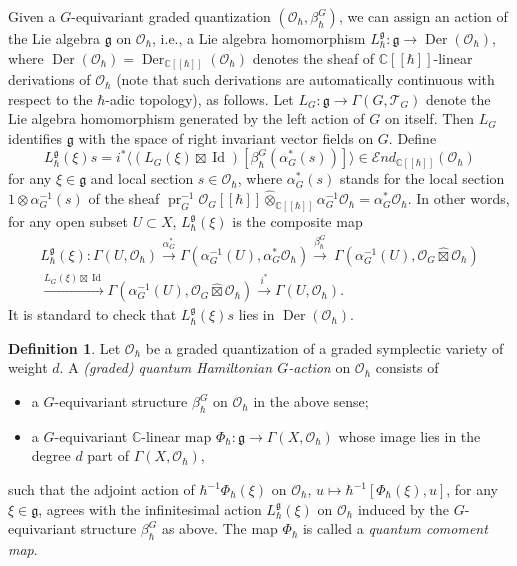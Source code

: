 \documentclass[12pt]{amsart}
\newcommand{\C}{\mathbb{C}}
\newcommand{\g}{\mathfrak{g}}
\newcommand{\send}{\mathcal{E}nd}
\newcommand{\Id}{\operatorname{Id}}
\newcommand{\pr}{\operatorname{pr}}
\newcommand{\T}{\mathcal{T}}
\newcommand{\OO}{\mathcal{O}}
\newcommand{\der}{{\operatorname{Der}}}
\theoremstyle{definition}
\newtheorem{defi}[Thm]{Definition}
\numberwithin{equation}{section}
\begin{document}
Given a $G$-equivariant graded quantization $(\OO_\hbar, \beta_\hbar^G)$, we can assign an action of the Lie algebra $\g$ on $\OO_\hbar$, i.e., a Lie algebra homomorphism $L_\hbar^\g : \g \to \der(\OO_\hbar)$, where $\der(\OO_\hbar) = \der_{\C[[\hbar]]}(\OO_\hbar)$ denotes the sheaf of $\C[[\hbar]]$-linear derivations of $\OO_\hbar$ (note that such derivations  are automatically continuous with respect to the $\hbar$-adic topology), as follows. Let $L_G : \g \to \Gamma(G, \T_G)$ denote the Lie algebra homomorphism generated by the left action of $G$ on itself. Then $L_G$ identifies $\g$ with the space of right invariant vector fields on $G$. Define
\begin{equation} \label{eq:inf_action_OO_h}
	L_\hbar^\g (\xi) s = i^* \langle (L_G (\xi) \boxtimes \Id) [\beta_\hbar^G (\alpha_G^*(s))] \rangle \in \send_{\C[[\hbar]]} (\OO_\hbar)
\end{equation}
for any $\xi \in \g$ and local section $s \in \OO_\hbar$, where $\alpha_G^*(s)$ stands for the local section $1 \otimes \alpha_G^{-1}(s)$ of the sheaf $ \pr_G^{-1}  \OO_G[[\hbar]]  \widehat{\otimes}_{\C[[\hbar]]} \alpha_G^{-1} \OO_\hbar = \alpha_G^* \OO_\hbar$. In other words, for any open subset $U \subset X$, $L_\hbar^\g(\xi)$ is the composite map
\begin{multline*}
	L_\hbar^\g (\xi) : \Gamma(U, \OO_\hbar) \xrightarrow{\alpha_G^*} \Gamma(\alpha_G^{-1}(U), \alpha_G^* \OO_\hbar) \xrightarrow{\beta_\hbar^G} \ \Gamma(\alpha_G^{-1}(U), \OO_G \widehat{\boxtimes} \OO_\hbar) \\ \xrightarrow{L_G(\xi) \boxtimes \Id} \Gamma(\alpha_G^{-1}(U), \OO_G \widehat{\boxtimes} \OO_\hbar) \xrightarrow{i^*} \Gamma(U, \OO_\hbar).
\end{multline*}
It is standard to check that $L_\hbar^\g (\xi) s$ lies in $\der(\OO_\hbar)$.

\begin{defi}\label{defi:Hamilt_action_quantization}
	Let $\OO_\hbar$ be a graded quantization of a graded symplectic variety of weight $d$. A \emph{(graded) quantum Hamiltonian $G$-action} on $\OO_\hbar$ consists of
	\begin{itemize}
		\item	
		a $G$-equivariant structure $\beta_\hbar^G$ on $\OO_\hbar$ in the above sense;
		\item
		a $G$-equivariant $\C$-linear map $\Phi_\hbar: \g \to \Gamma(X, \OO_\hbar)$	whose image lies in the degree $d$ part of $ \Gamma(X, \OO_\hbar)$,
	\end{itemize}
	such that the adjoint action of $\hbar^{-1} \Phi_\hbar (\xi)$ on $\OO_\hbar$, $u \mapsto \hbar^{-1} [\Phi_\hbar(\xi), u ]$, for any $\xi \in \g$, agrees with the infinitesimal action $L_\hbar^\g(\xi)$ on $\OO_\hbar$ induced by the $G$-equivariant structure $\beta_\hbar^G$ as above. The map $\Phi_\hbar$ is called a {\it quantum comoment map}.
\end{defi}
\end{document}
